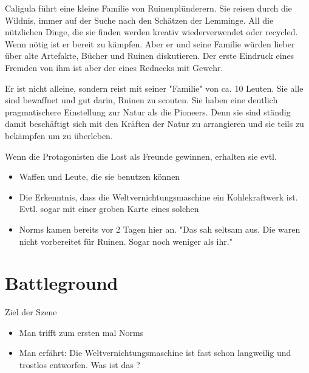 \begin{npcBox}[title=Caligula]
    \begin{consequences}
    \item {}
    \item {}
    \item {}
    \end{consequences}

    \begin{npcDescription}
    Caligula führt eine kleine Familie von Ruinenplünderern. Sie reisen durch die Wildnis, immer auf der Suche nach den Schätzen der Lemminge. All die nützlichen Dinge, die sie finden werden kreativ wiederverwendet oder recycled.
    Wenn nötig ist er bereit zu kämpfen. Aber er und seine Familie würden lieber über alte Artefakte, Bücher und Ruinen diskutieren. Der erste Eindruck eines Fremden von ihm ist aber der eines Rednecks mit Gewehr.
    \end{npcDescription}

    \end{npcBox}

Er ist nicht alleine, sondern reist mit seiner "Familie" von ca. 10 Leuten. Sie alle sind bewaffnet und gut darin, Ruinen zu scouten. Sie haben eine deutlich pragmatischere Einstellung zur Natur als die Pioneers. Denn sie sind ständig damit beschäftigt sich mit den Kräften der Natur zu arrangieren und sie teils zu bekämpfen um zu überleben.

Wenn die Protagonisten die Lost als Freunde gewinnen, erhalten sie evtl.

\begin{itemize}
    \item Waffen und Leute, die sie benutzen können
    \item Die Erkenntnis, dass die Weltvernichtungsmaschine ein Kohlekraftwerk ist. Evtl. sogar mit einer groben Karte eines solchen
    \item Norms kamen bereits vor 2 Tagen hier an. "Das sah seltsam aus. Die waren nicht vorbereitet für Ruinen. Sogar noch weniger als ihr."
\end{itemize}

\section{Battleground}

Ziel der Szene

\begin{itemize}
\item Man trifft zum ersten mal Norms
\item Man erfährt: Die Weltvernichtungsmaschine ist fast schon langweilig und trostlos entworfen. Was ist das ?
\end{itemize}

